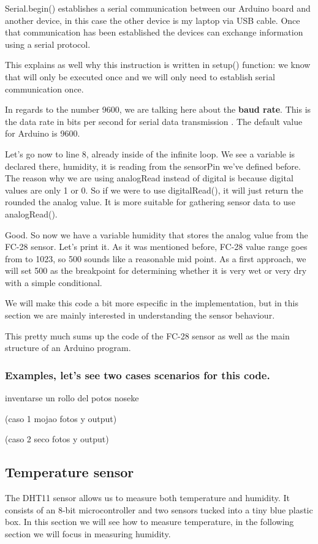 Serial.begin() establishes a serial communication between our Arduino board and another device, in this case the other device is my laptop via USB cable. Once that communication has been established the devices can exchange information using a serial protocol.

This explains as well why this instruction is written in setup() function: we know that will only be executed once and we will only need to establish serial communication once.

In regards to the number 9600, we are talking here about the \textbf{baud rate}. This is the data rate in bits per second for serial data transmission \cite{baud}. The default value for Arduino is 9600.

Let's go now to line 8, already inside of the infinite loop. We see a variable is declared there, humidity, it is reading from the sensorPin we've defined before. The reason why we are using analogRead instead of digital is because digital values are only 1 or 0. So if we were to use digitalRead(), it will just return the rounded the analog value. It is more suitable for gathering sensor data to use analogRead().

Good. So now we have a variable humidity that stores the analog value from the FC-28 sensor. Let's print it. As it was mentioned before, FC-28 value range goes from  to 1023, so 500 sounds like a reasonable mid point. As a first approach, we will set 500 as the breakpoint for determining whether it is very wet or very dry with a simple conditional.

We will make this code a bit more especific in the implementation, but in this section we are mainly interested in understanding the sensor behaviour.

This pretty much sums up the code of the FC-28 sensor as well as the main structure of an Arduino program.

\subsubsection{Examples, let's see two cases scenarios for this code.}

inventarse un rollo del potos noseke

(caso 1 mojao fotos y output)

(caso 2 seco fotos y output)


\subsection{Temperature sensor}
The DHT11 sensor\cite{dht11-manual} allows us to measure both temperature and humidity. It consists of an 8-bit microcontroller and two sensors tucked into a tiny blue plastic box. In this section we will see how to measure temperature, in the following section we will focus in measuring humidity.


